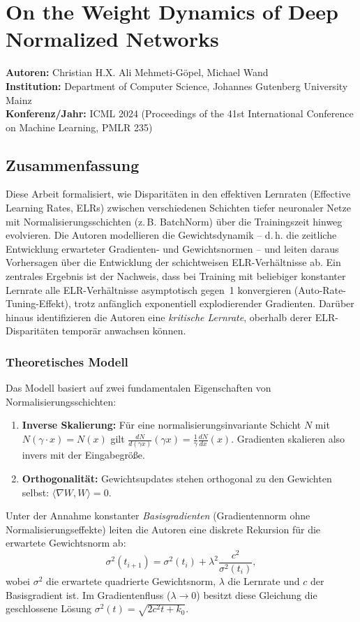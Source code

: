 \documentclass[a4paper,12pt]{article}
\begin{document}
\section*{On the Weight Dynamics of Deep Normalized Networks}

\textbf{Autoren:} Christian H.X. Ali Mehmeti-Göpel, Michael Wand \\
\textbf{Institution:} Department of Computer Science, Johannes Gutenberg University Mainz \\
\textbf{Konferenz/Jahr:} ICML 2024 (Proceedings of the 41st International Conference on Machine Learning, PMLR 235)

\subsection*{Zusammenfassung}

Diese Arbeit formalisiert, wie Disparitäten in den effektiven Lernraten (Effective Learning Rates, ELRs) zwischen verschiedenen Schichten tiefer neuronaler Netze mit Normalisierungsschichten (z.\,B. BatchNorm) über die Trainingszeit hinweg evolvieren. Die Autoren modellieren die Gewichtsdynamik -- d.\,h. die zeitliche Entwicklung erwarteter Gradienten- und Gewichtsnormen -- und leiten daraus Vorhersagen über die Entwicklung der schichtweisen ELR-Verhältnisse ab. Ein zentrales Ergebnis ist der Nachweis, dass bei Training mit beliebiger konstanter Lernrate alle ELR-Verhältnisse asymptotisch gegen~1 konvergieren (Auto-Rate-Tuning-Effekt), trotz anfänglich exponentiell explodierender Gradienten. Darüber hinaus identifizieren die Autoren eine \emph{kritische Lernrate}, oberhalb derer ELR-Disparitäten temporär anwachsen können.

\subsubsection*{Theoretisches Modell}

Das Modell basiert auf zwei fundamentalen Eigenschaften von Normalisierungsschichten:
\begin{enumerate}
    \item \textbf{Inverse Skalierung:} Für eine normalisierungsinvariante Schicht $N$ mit $N(\gamma \cdot x) = N(x)$ gilt $\frac{dN}{d(\gamma x)}(\gamma x) = \frac{1}{\gamma} \frac{dN}{dx}(x)$. Gradienten skalieren also invers mit der Eingabegröße.
    \item \textbf{Orthogonalität:} Gewichtsupdates stehen orthogonal zu den Gewichten selbst: $\langle \nabla W, W \rangle = 0$.
\end{enumerate}
Unter der Annahme konstanter \emph{Basisgradienten} (Gradientennorm ohne Normalisierungseffekte) leiten die Autoren eine diskrete Rekursion für die erwartete Gewichtsnorm ab:
\[
\sigma^2(t_{i+1}) = \sigma^2(t_i) + \lambda^2 \frac{c^2}{\sigma^2(t_i)},
\]
wobei $\sigma^2$ die erwartete quadrierte Gewichtsnorm, $\lambda$ die Lernrate und $c$ der Basisgradient ist. Im Gradientenfluss ($\lambda \to 0$) besitzt diese Gleichung die geschlossene Lösung $\sigma^2(t) = \sqrt{2c^2 t + k_0}$.
\end{document}
